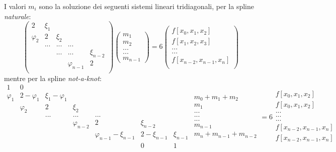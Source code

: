 I valori $m_i$ sono la soluzione dei seguenti sistemi lineari tridiagonali,
per la spline \textit{naturale}:
\[
	\begin{pmatrix}
		2 		& \xi_1 	& 			& 		& 	\\
		\varphi_2 	& 2			& \xi_2	& 		& 	\\
				& ...			& ...			& ... 	& 	\\
				& 			& ...			& ... 	& \xi_{n-2}	\\
				& 			& 			& \varphi_{n-1} 	& 2	\\
	\end{pmatrix}
	\begin{pmatrix}
		m_1 \\
		m_2 \\
		... \\
		... \\
		m_{n-1}
	\end{pmatrix}
	= 6
	\begin{pmatrix}
		f[x_0, x_1, x_2] \\
		f[x_1, x_2, x_3] \\
		... \\
		... \\
		f[x_{n-2}, x_{n-1}, x_n] \\
	\end{pmatrix}
\]
mentre per la spline \textit{not-a-knot}:
\[
	\begin{smallmatrix}
		1 & 0 & & & & & \\
		\varphi_1 & 2-\varphi_1 & \xi_1 - \varphi_1 & & & & \\
		 & \varphi_2 & 2 & \xi_2 & & & \\
		 & & ... & ... & ... & & \\
		 & & & \varphi_{n-2} & 2 & \xi_{n-2} & \\
		 & & & &  \varphi_{n-1} - \xi_{n-1} & 2-\xi_{n-1} & \xi_{n-1} \\
		 & & & & & 0 & 1 \\
	\end{smallmatrix}
	\begin{smallmatrix}
		m_0+m_1+m_2 \\
		m_1 \\
		... \\
		... \\
		... \\
		m_{n-1}\\
		m_n+m_{n-1}+m_{n-2} \\		
	\end{smallmatrix}
	= 6
	\begin{smallmatrix}
		f[x_0, x_1, x_2] \\
		f[x_0, x_1, x_2] \\
		... \\
		... \\
		... \\
		f[x_{n-2}, x_{n-1}, x_n] \\
		f[x_{n-2}, x_{n-1}, x_n] \\
	\end{smallmatrix}
\]




